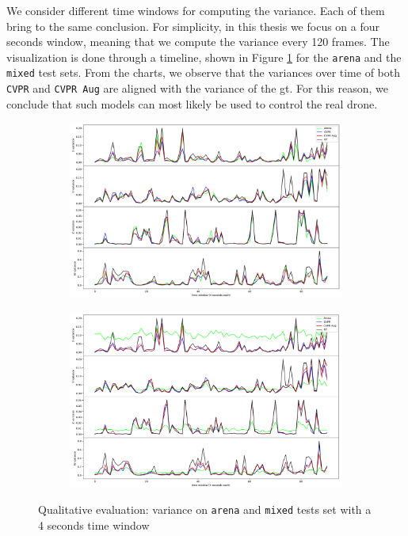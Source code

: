 \bigskip

We consider different time windows for computing the variance. Each of them bring to the same conclusion. For simplicity, in this thesis we focus on a four seconds window, meaning that we compute the variance every 120 frames. The visualization is done through a timeline, shown in Figure \ref{fig:ql-variance} for the \texttt{arena} and the \texttt{mixed} test sets. From the charts, we observe that the variances over time of both \texttt{CVPR} and \texttt{CVPR Aug} are aligned with the variance of the \gls{gt}. For this reason, we conclude that such models can most likely be used to control the real drone.

\begin{figure}[!h]
	\begin{center}
		\begin{subfigure}[h]{0.49\textwidth}
			\centering
			\includegraphics[width=1\textwidth]{"contents/images/06-variance-arena"}
		\end{subfigure}
		\hfill
		\begin{subfigure}[h]{0.49\textwidth}
			\centering
			\includegraphics[width=1\textwidth]{"contents/images/06-variance-mixed"}
		\end{subfigure}
	\end{center}
	\vspace{-0.5cm}
	\caption[Qualitative evaluation: variance on \texttt{arena} and \texttt{mixed} tests set with a 4 seconds time window]{Qualitative evaluation: variance on \texttt{arena} and \texttt{mixed} tests set with a 4 seconds time window}
	\label{fig:ql-variance}
\end{figure}
